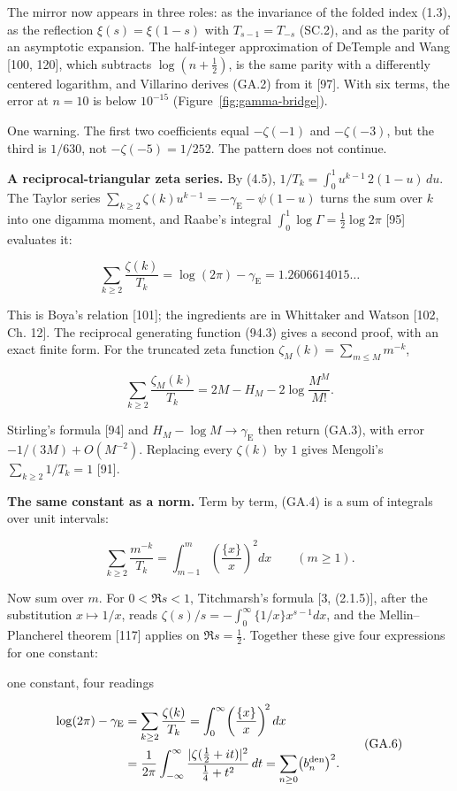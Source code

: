 \documentclass[
  11pt,
]{book}
\newcommand{\figref}[1]{Figure~\ref{#1}}
\begin{document}
The mirror now appears in three roles: as the invariance of the folded
index (1.3), as the reflection \(\xi(s)=\xi(1-s)\) with
\(T_{s-1}=T_{-s}\) (SC.2), and as the parity of an asymptotic expansion.
The half-integer approximation of DeTemple and Wang {[}100, 120{]},
which subtracts \(\log(n+\tfrac12)\), is the same parity with a
differently centered logarithm, and Villarino derives (GA.2) from it
{[}97{]}. With six terms, the error at \(n=10\) is below \(10^{-15}\)
(\figref{fig:gamma-bridge}).

One warning. The first two coefficients equal \(-\zeta(-1)\) and
\(-\zeta(-3)\), but the third is \(1/630\), not \(-\zeta(-5)=1/252\).
The pattern does not continue.

\textbf{A reciprocal-triangular zeta series.} By (4.5),
\(1/T_k=\int_0^1u^{k-1}\,2(1-u)\,du\). The Taylor series
\(\sum_{k\ge2}\zeta(k)u^{k-1}=-\gamma_{\mathrm E}-\psi(1-u)\) turns the
sum over \(k\) into one digamma moment, and Raabe's integral
\(\int_0^1\log\Gamma=\tfrac12\log2\pi\) {[}95{]} evaluates it:

\[
\boxed{\sum_{k\ge2}\frac{\zeta(k)}{T_k}=\log(2\pi)-\gamma_{\mathrm E}=1.2606614015\ldots}
\tag{GA.3}
\]

This is Boya's relation {[}101{]}; the ingredients are in Whittaker and
Watson {[}102, Ch. 12{]}. The reciprocal generating function (94.3)
gives a second proof, with an exact finite form. For the truncated zeta
function \(\zeta_M(k)=\sum_{m\le M}m^{-k}\),

\[
\sum_{k\ge2}\frac{\zeta_M(k)}{T_k}=2M-H_M-2\log\frac{M^M}{M!}.
\tag{GA.4}
\]

Stirling's formula {[}94{]} and \(H_M-\log M\to\gamma_{\mathrm E}\) then
return (GA.3), with error \(-1/(3M)+O(M^{-2})\). Replacing every
\(\zeta(k)\) by \(1\) gives Mengoli's \(\sum_{k\ge2}1/T_k=1\) {[}91{]}.

\textbf{The same constant as a norm.} Term by term, (GA.4) is a sum of
integrals over unit intervals:

\[
\sum_{k\ge2}\frac{m^{-k}}{T_k}=\int_{m-1}^{m}\left(\frac{\{x\}}x\right)^2dx
\qquad(m\ge1).
\tag{GA.5}
\]

Now sum over \(m\). For \(0<\Re s<1\), Titchmarsh's formula {[}3,
(2.1.5){]}, after the substitution \(x\mapsto1/x\), reads
\(\zeta(s)/s=-\int_0^\infty\{1/x\}x^{s-1}dx\), and the
Mellin--Plancherel theorem {[}117{]} applies on \(\Re s=\tfrac12\).
Together these give four expressions for one constant:

\begin{tnclosed}{one constant, four readings}

\[
\begin{aligned}
\log(2\pi)-\gamma_{\mathrm E}
&=\sum_{k\ge2}\frac{\zeta(k)}{T_k}
=\int_0^\infty\!\left(\frac{\{x\}}x\right)^{\!2}dx\\
&=\frac1{2\pi}\int_{-\infty}^{\infty}\frac{|\zeta(\tfrac12+it)|^2}{\tfrac14+t^2}\,dt
=\sum_{n\ge0}\bigl(b_n^{\rm den}\bigr)^2.
\end{aligned}
\tag{GA.6}
\]

\end{tnclosed}
\end{document}
